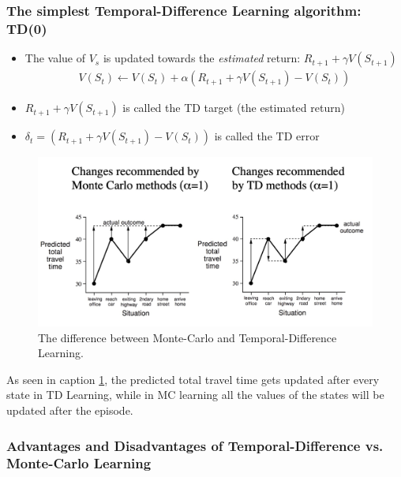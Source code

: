 \documentclass[10pt]{article}
\begin{document}
\subsubsection*{The simplest Temporal-Difference Learning algorithm: TD(0)}
\begin{itemize}
\item The value of $V_{s}$ is updated towards the \textit{estimated} return: $R_{t+1}+\gamma V(S_{t+1})$
\begin{align*}
V(S_{t}) \leftarrow V(S_{t}) + \alpha (R_{t+1}+\gamma V(S_{t+1}) - V(S_{t}))
\end{align*}
\item $R_{t+1}+\gamma V(S_{t+1})$     is called the TD target (the estimated return)
\item $\delta_{t} = (R_{t+1}+\gamma V(S_{t+1}) - V(S_{t}))$     is called the TD error
\end{itemize}

\begin{figure}
\includegraphics[scale=0.2]{pictures/mc_td.jpg}
\caption{The difference between Monte-Carlo and Temporal-Difference Learning.}
\label{img:mc_td}
\end{figure}

As seen in caption \ref{img:mc_td}, the predicted total travel time gets updated after every state in TD Learning, while in MC learning all the values of the states will be updated after the episode.

\subsubsection*{Advantages and Disadvantages of Temporal-Difference vs. Monte-Carlo Learning}
\end{document}
